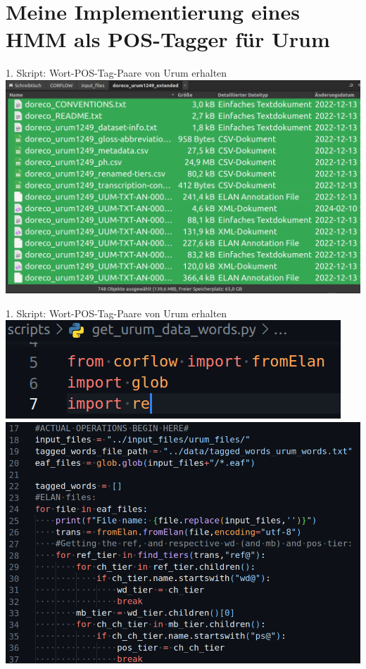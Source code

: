\documentclass{beamer}
\begin{document}
\section{Meine Implementierung eines HMM als POS-Tagger für Urum}

\begin{frame}[t]{1. Skript: Wort-POS-Tag-Paare von Urum erhalten}
	\includegraphics[scale=0.35]{"./pics/get_urum_script_pics/files.png"}
\end{frame}

\begin{frame}[t]{1. Skript: Wort-POS-Tag-Paare von Urum erhalten}
\includegraphics[scale=0.5]{"./pics/get_urum_script_pics/01.png"}
\includegraphics[scale=0.45]{"./pics/get_urum_script_pics/02.png"}
\end{frame}
\end{document}
